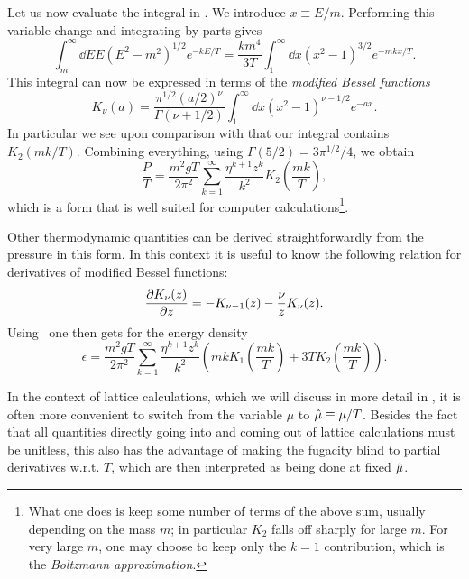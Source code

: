 Let us now evaluate the integral in . We introduce
$x\equiv E/m$. Performing this variable change and integrating by parts gives
\begin{equation}\label{eq:pressint}
  \int_m^\infty\dd{E}E\left(E^2-m^2\right)^{1/2}e^{-kE/T}
  =\frac{km^4}{3T}\int_1^\infty\dd x\left(x^2-1\right)^{3/2}e^{-mkx/T}.
\end{equation}
This integral can now be expressed in terms of the
{\it modified Bessel functions}
\begin{equation}
  K_\nu(a)=\frac{\pi^{1/2}(a/2)^\nu}{\Gamma(\nu+1/2)}
             \int_1^\infty\dd x(x^2-1)^{\nu-1/2}e^{-ax}.
\end{equation}
In particular we see upon comparison with 
that our integral contains $K_2(mk/T)$. Combining everything,
using $\Gamma(5/2)=3\pi^{1/2}/4$, we obtain
\begin{equation}\label{eq:pressrelQM}
  \frac{P}{T}=\frac{m^2gT}{2\pi^2}\sum_{k=1}^\infty\frac{\eta^{k+1}z^k}{k^2}
                         K_2\left(\frac{mk}{T}\right),
\end{equation}
which is a form that is well suited for computer calculations\footnote{What
one does is keep some number of terms of the above sum, usually depending
on the mass $m$; in particular $K_2$ falls off sharply for large $m$.
For very large $m$, one may choose to keep only the $k=1$ contribution,
which is the {\it Boltzmann approximation}.}.

Other thermodynamic quantities can be derived straightforwardly
from the pressure in this form. In this context it is useful to know
the following relation for derivatives of modified Bessel functions:
\begin{equation}
  \pdv{K_\nu(z)}{z}=-K_{\nu-1}(z)-\frac{\nu}{z}K_\nu(z).
\end{equation}
Using~ one then gets for the energy density
\begin{equation}\label{eq:edensityQM}
  \epsilon=\frac{m^2gT}{2\pi^2}\sum_{k=1}^\infty\frac{\eta^{k+1}z^k}{k^2}
              \left( mk K_1\left(\frac{mk}{T}\right) 
                    + 3TK_2\left(\frac{mk}{T}\right) \right).
\end{equation}

In the context of lattice calculations, which we will discuss in more
detail in , it is often more convenient to switch
from the variable $\mu$ to $\hat{\mu}\equiv\mu/T$. Besides the fact that
all quantities directly going into and coming out of lattice calculations
must be unitless, this also has the advantage of making the
fugacity blind to partial derivatives w.r.t. $T$, which are then 
interpreted as being done at fixed $\hat{\mu}$.

